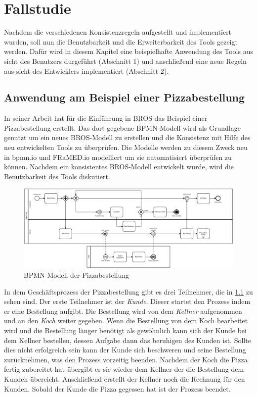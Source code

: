 \chapter{Fallstudie}

Nachdem die verschiedenen Konsistenzregeln aufgestellt und implementiert wurden, soll nun die Benutzbarkeit und die Erweiterbarkeit des Tools gezeigt werden.
Dafür wird in diesem Kapitel eine beispielhafte Anwendung des Tools aus sicht des Benutzers durgeführt (Abschnitt 1) und anschließend eine neue Regeln aus sicht des Entwicklers implementiert (Abschnitt 2).

\section{Anwendung am Beispiel einer Pizzabestellung}

In seiner Arbeit hat \cite{Schoen} für die Einführung in BROS das Beispiel einer Pizzabestellung erstellt.
Das dort gegebene BPMN-Modell wird als Grundlage genutzt um ein neues BROS-Modell zu erstellen und die Konsistenz mit Hilfe des neu entwickelten Tools zu überprüfen.
Die Modelle werden zu diesem Zweck neu in bpmn.io und FRaMED.io modelliert um sie automatisiert überprüfen zu können.
Nachdem ein konsistentes BROS-Modell entwickelt wurde, wird die Benutzbarkeit des Tools diskutiert.

\begin{figure}
    \centering
    \includegraphics[width=\textwidth,keepaspectratio]{../images/example/bpmn.pdf}%
    \caption{BPMN-Modell der Pizzabestellung}%
    \label{fig:pizzaBpmn}
\end{figure}

In dem Geschäftsprozess der Pizzabestellung gibt es drei Teilnehmer, die in \cref{fig:pizzaBpmn} zu sehen sind.
Der erste Teilnehmer ist der  \emph{Kunde}.
Dieser startet den Prozess indem er eine Bestellung aufgibt.
Die Bestellung wird von dem \emph{Kellner} aufgenommen und an den \emph{Koch} weiter gegeben.
Wenn die Bestellung von dem Koch bearbeitet wird und die Bestellung länger benötigt als gewöhnlich kann sich der Kunde bei dem Kellner bestellen, dessen Aufgabe dann das beruhigen des Kunden ist.
Sollte dies nicht erfolgreich sein kann der Kunde sich beschweren und seine Bestellung zurücknehmen, was den Prozess vorzeitig beenden.
Nachdem der Koch die Pizza fertig zubereitet hat übergibt er sie wieder dem Kellner der die Bestellung dem Kunden übereicht.
Anschließend erstellt der Kellner noch die Rechnung für den Kunden.
Sobald der Kunde die Pizza gegessen hat ist der Prozess beendet.

